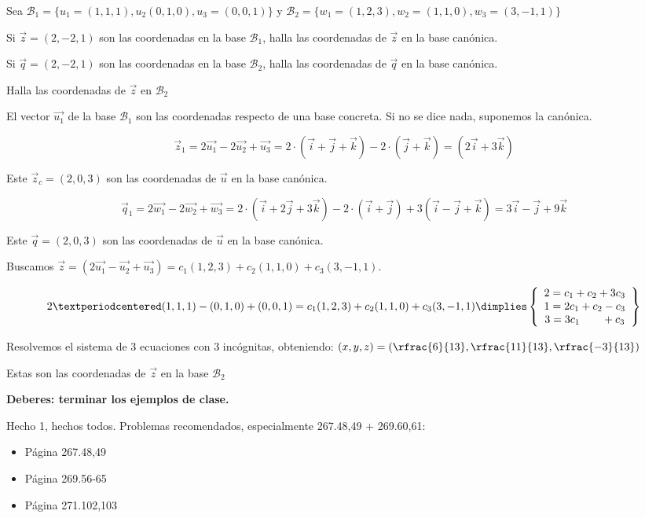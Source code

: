 \begin{problem}

Sea 
$\mathcal{B}_1 = \{ u_1=(1,1,1), u_2(0,1,0), u_3=(0,0,1)\}$
y
$\mathcal{B}_2 = \{ w_1=(1,2,3), w_2=(1,1,0), w_3=(3,-1,1)\}$

\ppart Si $\vec{z} = (2,-2,1)$ son las coordenadas en la base $\mathcal{B}_1$, halla las coordenadas de $\vec{z}$ en la base canónica.


\ppart Si $\vec{q} = (2,-2,1)$ son las coordenadas en la base $\mathcal{B}_2$, halla las coordenadas de $\vec{q}$ en la base canónica.


\ppart Halla las coordenadas de $\vec{z}$ en $\mathcal{B}_2$

\obs El vector $\vec{u_1}$ de la base $\mathcal{B}_1$ son las coordenadas respecto de una base concreta. 
%
Si no se dice nada, suponemos la canónica.

\solution

\spart
\[\vec{z}_1 = 2\vec{u_1} -2\vec{u_2} + \vec{u_3} = 2·(\vec{i} +\vec{j} + \vec{k}) - 2·(\vec{j} + \vec{k}) = (2\vec{i}+3\vec{k})\]

Este $\vec{z}_c = (2,0,3)$ son las coordenadas de $\vec{u}$ en la base canónica.


\spart 

\[
\vec{q}_1 = 2\vec{w_1} -2\vec{w_2} + \vec{w_3} = 
2·(\vec{i} +2\vec{j} + 3\vec{k}) - 2·(\vec{i}+\vec{j}) + 3(\vec{i} -\vec{j} + \vec{k}) = 
3\vec{i} -\vec{j} + 9\vec{k}
\]

Este $\vec{q} = (2,0,3)$ son las coordenadas de $\vec{u}$ en la base canónica.

\spart
Buscamos 
$\vec{z} = (2\vec{u_1}-\vec{u_2}+\vec{u_3}) = c_1(1,2,3) + c_2 (1,1,0) + c_3 ( 3,-1,1)$.

\[
2·(1,1,1) - (0,1,0) + (0,0,1) = c_1(1,2,3) + c_2 (1,1,0) + c_3 ( 3,-1,1)\dimplies \left\{
  \begin{array}{c}
    2 = c_1 + c_2 + 3c_3\\
    1 = 2c_1 + c_2 -c_3\\
    3 = 3c_1  \quad\quad +c_3 
  \end{array}
  \right\}
\]

Resolvemos el sistema de 3 ecuaciones con 3 incógnitas, obteniendo: $(x,y,z) = \left(\rfrac{6}{13},\rfrac{11}{13},\rfrac{-3}{13}\right)$

Estas son las coordenadas de $\vec{z}$ en la base $\mathcal{B}_2$

\end{problem}

\textbf{Deberes: terminar los ejemplos de clase.}

Hecho 1, hechos todos. Problemas recomendados, especialmente 267.48,49 + 269.60,61: 
\begin{itemize}
  \item Página 267.48,49
  \item Página 269.56-65
  \item Página 271.102,103
\end{itemize}

